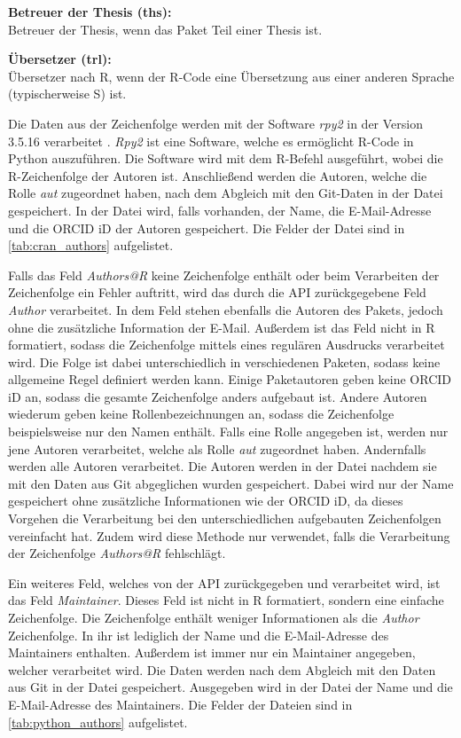 \textbf{Betreuer der Thesis (ths):}\\
Betreuer der Thesis, wenn das Paket Teil einer Thesis ist.

\textbf{Übersetzer (trl):}\\
Übersetzer nach R, wenn der R-Code eine Übersetzung aus einer anderen Sprache (typischerweise S) ist.

Die Daten aus der Zeichenfolge werden mit der Software \emph{rpy2} in der Version 3.5.16 verarbeitet \autocite{gautier_rpy2_2024}.
\emph{Rpy2} ist eine Software, welche es ermöglicht R-Code in Python auszuführen.
Die Software wird mit dem R-Befehl  ausgeführt, wobei  die R-Zeichenfolge der Autoren ist.
Anschließend werden die Autoren, welche die Rolle \emph{aut} zugeordnet haben, nach dem Abgleich mit den Git-Daten in der Datei  gespeichert.
In der Datei wird, falls vorhanden, der Name, die E-Mail-Adresse und die ORCID iD der Autoren gespeichert.
Die Felder der Datei sind in \autoref{tab:cran_authors} aufgelistet.

Falls das Feld \emph{Authors@R} keine Zeichenfolge enthält oder beim Verarbeiten der Zeichenfolge ein Fehler auftritt, wird das durch die API zurückgegebene Feld \emph{Author} verarbeitet.
In dem Feld stehen ebenfalls die Autoren des Pakets, jedoch ohne die zusätzliche Information der E-Mail.
Außerdem ist das Feld nicht in R formatiert, sodass die Zeichenfolge mittels eines regulären Ausdrucks verarbeitet wird.
Die Folge ist dabei unterschiedlich in verschiedenen Paketen, sodass keine allgemeine Regel definiert werden kann.
Einige Paketautoren geben keine ORCID iD an, sodass die gesamte Zeichenfolge anders aufgebaut ist.
Andere Autoren wiederum geben keine Rollenbezeichnungen an, sodass die Zeichenfolge beispielsweise nur den Namen enthält.
Falls eine Rolle angegeben ist, werden nur jene Autoren verarbeitet, welche als Rolle \emph{aut} zugeordnet haben.
Andernfalls werden alle Autoren verarbeitet.
Die Autoren werden in der Datei  nachdem sie mit den Daten aus Git abgeglichen wurden gespeichert.
Dabei wird nur der Name gespeichert ohne zusätzliche Informationen wie der ORCID iD, da dieses Vorgehen die Verarbeitung bei den unterschiedlichen aufgebauten Zeichenfolgen vereinfacht hat.
Zudem wird diese Methode nur verwendet, falls die Verarbeitung der Zeichenfolge \emph{Authors@R} fehlschlägt.

Ein weiteres Feld, welches von der API zurückgegeben und verarbeitet wird, ist das Feld \emph{Maintainer}.
Dieses Feld ist nicht in R formatiert, sondern eine einfache Zeichenfolge.
Die Zeichenfolge enthält weniger Informationen als die \emph{Author} Zeichenfolge.
In ihr ist lediglich der Name und die E-Mail-Adresse des Maintainers enthalten.
Außerdem ist immer nur ein Maintainer angegeben, welcher verarbeitet wird.
Die Daten werden nach dem Abgleich mit den Daten aus Git in der Datei  gespeichert.
Ausgegeben wird in der Datei der Name und die E-Mail-Adresse des Maintainers.
Die Felder der Dateien sind in \autoref{tab:python_authors} aufgelistet.

